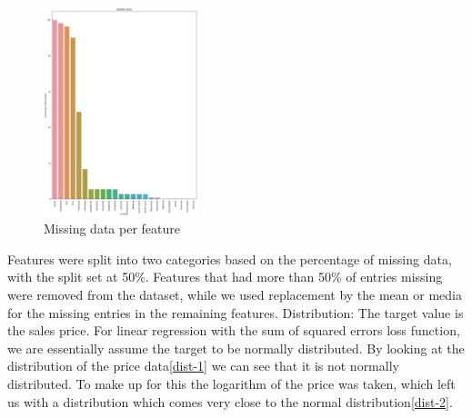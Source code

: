 \begin{figure}[h!]
  \centering
  \includegraphics[width=0.4\textwidth]{images/missing-data-count-chart.png}
  \caption{Missing data per feature}
  \label{fig:missing}
\end{figure}

Features were split into two categories based on the percentage of missing data, with the split set at 50\%. Features that had more than 50\% of entries missing were removed from the dataset, while we used replacement by the mean or media for the missing entries in the remaining features.\newline
Distribution:\newline
The target value is the sales price. For linear regression with the sum of squared errors loss function, we are essentially assume the target to be normally distributed. By looking at the distribution of the price data\ref{dist-1} we can see that it is not normally distributed. To make up for this the logarithm of the price was taken, which left us with a distribution which comes very close to the normal distribution\ref{dist-2}.

